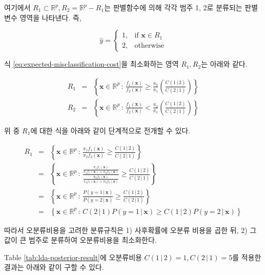 \documentclass[
]{book}
\begin{document}
여기에서 \(R_1 \subset \mathbb{R}^p, R_2 = \mathbb{R}^p - R_{1}\)는 판별함수에 의해 각각 범주 1, 2로 분류되는 판별변수 영역을 나타낸다. 즉,

\begin{equation*}
\hat{y} = \begin{cases}
    1, & \text{if } \mathbf{x} \in R_1  \\
    2, & \text{otherwise}
\end{cases}
\end{equation*}

식 \eqref{eq:expected-misclassification-cost}을 최소화하는 영역 \(R_1, R_2\)는 아래와 같다.

\begin{eqnarray*}
R_1 &=& \left\{\mathbf{x} \in \mathbb{R}^p \, :  \, \frac{f_1(\mathbf{x})}{f_2(\mathbf{x})} \ge \frac{\pi_2}{\pi_1} \left( \frac{C(1 \, | \, 2)}{C(2 \, | \, 1)} \right) \right\}\\
R_2 &=& \left\{\mathbf{x} \in \mathbb{R}^p \, :  \, \frac{f_1(\mathbf{x})}{f_2(\mathbf{x})} < \frac{\pi_2}{\pi_1} \left( \frac{C(1 \, | \, 2)}{C(2 \, | \, 1)} \right) \right\}
\end{eqnarray*}

위 중 \(R_1\)에 대한 식을 아래와 같이 단계적으로 전개할 수 있다.

\begin{eqnarray*}
R_1 &=& \left\{\mathbf{x} \in \mathbb{R}^p \, :  \, \frac{\pi_1 f_1(\mathbf{x})}{\pi_2 f_2(\mathbf{x})} \ge \frac{C(1 \, | \, 2)}{C(2 \, | \, 1)} \right\}\\
&=& \left\{\mathbf{x} \in \mathbb{R}^p \, :  \, \frac{\frac{\pi_1 f_1(\mathbf{x})}{\pi_1 f_1(\mathbf{x}) + \pi_2 f_2(\mathbf{x})}}{\frac{\pi_2 f_2(\mathbf{x})}{\pi_1 f_1(\mathbf{x}) + \pi_2 f_2(\mathbf{x})}} \ge \frac{C(1 \, | \, 2)}{C(2 \, | \, 1)} \right\}\\
&=& \left\{\mathbf{x} \in \mathbb{R}^p \, :  \, \frac{P(y = 1 \, | \, \mathbf{x})}{P(y = 2 \, | \, \mathbf{x})} \ge \frac{C(1 \, | \, 2)}{C(2 \, | \, 1)} \right\}\\
&=& \left\{\mathbf{x} \in \mathbb{R}^p \, :  \, C(2 \, | \, 1) P(y = 1 \, | \, \mathbf{x}) \ge C(1 \, | \, 2) P(y = 2 \, | \, \mathbf{x}) \right\}
\end{eqnarray*}

따라서 오분류비용을 고려한 분류규칙은 1) 사후확률에 오분류 비용을 곱한 뒤, 2) 그 값이 큰 범주로 분류하여 오분류비용을 최소화한다.

Table \ref{tab:lda-posterior-result}에 오분류비용 \(C(1 \, | \, 2) = 1, C(2 \, | \, 1) = 5\)를 적용한 결과는 아래와 같이 구할 수 있다.
\end{document}
